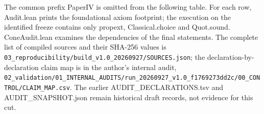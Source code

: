 \documentclass[english,11pt,a4paper]{article}
\begin{document}
The common prefix {\ttfamily\small PaperIV} is omitted from the following table. For each row, {\ttfamily\small Audit.\discretionary{\hbox{\ensuremath{\hookrightarrow}}}{}{}lean} prints the foundational axiom footprint; the execution on the identified freeze contains only {\ttfamily\small propext}, {\ttfamily\small Classical.\discretionary{\hbox{\ensuremath{\hookrightarrow}}}{}{}choice} and {\ttfamily\small Quot.\discretionary{\hbox{\ensuremath{\hookrightarrow}}}{}{}sound}. {\ttfamily\small ConeAudit.\discretionary{\hbox{\ensuremath{\hookrightarrow}}}{}{}lean} examines the dependencies of the final statements. The complete list of compiled sources and their SHA-256 values is \nolinkurl{03_reproducibility/build_v1.0_20260927/SOURCES.json}; the declaration-by-declaration claim map is in the author's internal audit, \nolinkurl{02_validation/01_INTERNAL_AUDITS/run_20260927_v1.0_f1769273dd2c/00_CONTROL/CLAIM_MAP.csv}. The earlier {\ttfamily\small AUDIT\_\discretionary{\hbox{\ensuremath{\hookrightarrow}}}{}{}DECLARATIONS\discretionary{\hbox{\ensuremath{\hookrightarrow}}}{}{}.\discretionary{\hbox{\ensuremath{\hookrightarrow}}}{}{}tsv} and {\ttfamily\small AUDIT\_\discretionary{\hbox{\ensuremath{\hookrightarrow}}}{}{}SNAPSHOT.\discretionary{\hbox{\ensuremath{\hookrightarrow}}}{}{}json} remain historical draft records, not evidence for this cut.
\end{document}
